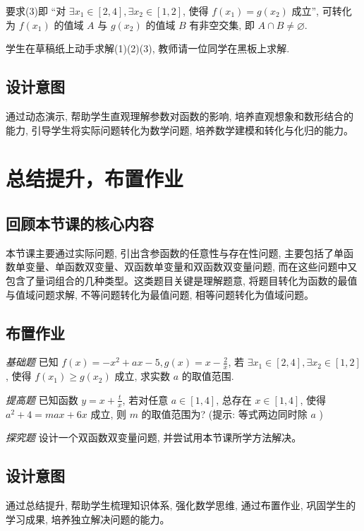 要求(3)即 “对 \(\exists {x}_{1} \in  \left\lbrack  {2, 4}\right\rbrack  , \exists {x}_{2} \in  \left\lbrack  {1, 2}\right\rbrack\), 使得 \(f\left( {x}_{1}\right)  = g\left( {x}_{2}\right)\) 成立”, 可转化为 \(f\left( {x}_{1}\right)\) 的值域 \(A\) 与 \(g\left( {x}_{2}\right)\) 的值域 \(B\) 有非空交集, 即 \(A \cap  B \neq  \varnothing\).

学生在草稿纸上动手求解(1)(2)(3), 教师请一位同学在黑板上求解.


\subsection{设计意图}
通过动态演示, 帮助学生直观理解参数对函数的影响, 培养直观想象和数形结合的能力, 引导学生将实际问题转化为数学问题, 培养数学建模和转化与化归的能力。


\section{总结提升，布置作业}
\subsection{回顾本节课的核心内容}
本节课主要通过实际问题, 引出含参函数的任意性与存在性问题, 主要包括了单函数单变量、单函数双变量、双函数单变量和双函数双变量问题, 而在这些问题中又包含了量词组合的几种类型。这类题目关键是理解题意, 将题目转化为函数的最值与值域问题求解, 不等问题转化为最值问题, 相等问题转化为值域问题。


\subsection{布置作业}
\noindent\emph{基础题} 已知 \(f(x)  =  - {x}^{2} + {ax} - 5, g(x)  = x - \frac{2}{x}\), 若 \(\exists {x}_{1} \in  \left\lbrack  {2, 4}\right\rbrack  , \exists {x}_{2} \in  \left\lbrack  {1, 2}\right\rbrack\), 使得 \(f\left( {x}_{1}\right)  \geq  g\left( {x}_{2}\right)\) 成立, 求实数 \(a\) 的取值范围.

\noindent\emph{提高题} 已知函数 \(y = x + \frac{t}{x}\), 若对任意 \(a \in  \left\lbrack  {1, 4}\right\rbrack\), 总存在 \(x \in  \left\lbrack  {1, 4}\right\rbrack\), 使得 \({a}^{2} + 4 = max  + {6x}\) 成立, 则 \(m\) 的取值范围为? (提示: 等式两边同时除 \(a\) )

\noindent\emph{探究题} 设计一个双函数双变量问题, 并尝试用本节课所学方法解决。


\subsection{设计意图}

通过总结提升, 帮助学生梳理知识体系, 强化数学思维, 通过布置作业, 巩固学生的学习成果, 培养独立解决问题的能力。

